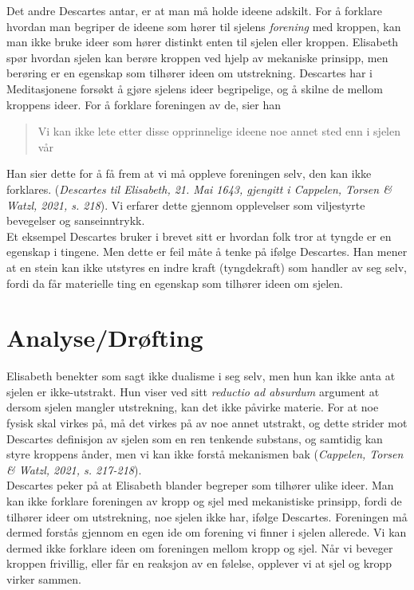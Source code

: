 \documentclass[12pt, a4paper]{article}
\begin{document}
Det andre Descartes antar, er at man må holde ideene adskilt. For å forklare hvordan man begriper de ideene som hører til sjelens \textit{forening} med kroppen, kan man ikke bruke ideer som hører distinkt enten til sjelen eller kroppen. Elisabeth spør hvordan sjelen kan berøre kroppen ved hjelp av mekaniske prinsipp, men berøring er en egenskap som tilhører ideen om utstrekning. Descartes har i Meditasjonene forsøkt å gjøre sjelens ideer begripelige, og å skilne de mellom kroppens ideer. For å forklare foreningen av de, sier han \begin{quote}
    Vi kan ikke lete etter disse opprinnelige ideene noe annet sted enn i sjelen vår
\end{quote} Han sier dette for å få frem at vi må oppleve foreningen selv, den kan ikke forklares. (\textit{Descartes til Elisabeth, 21. Mai 1643, gjengitt i Cappelen, Torsen \& Watzl, 2021, s. 218}). Vi erfarer dette gjennom opplevelser som viljestyrte bevegelser og sanseinntrykk. \\

Et eksempel Descartes bruker i brevet sitt er hvordan folk tror at tyngde er en egenskap i tingene. Men dette er feil måte å tenke på ifølge Descartes. Han mener at en stein kan ikke utstyres en indre kraft (tyngdekraft) som handler av seg selv, fordi da får materielle ting en egenskap som tilhører ideen om sjelen. 

\section{Analyse/Drøfting}

Elisabeth benekter som sagt ikke dualisme i seg selv, men hun kan ikke anta at sjelen er ikke-utstrakt. Hun viser ved sitt \textit{reductio ad absurdum} argument at dersom sjelen mangler utstrekning, kan det ikke påvirke materie. For at noe fysisk skal virkes på, må det virkes på av noe annet utstrakt, og dette strider mot Descartes definisjon av sjelen som en ren tenkende substans, og samtidig kan styre kroppens ånder, men vi kan ikke forstå mekanismen bak (\textit{Cappelen, Torsen \& Watzl, 2021, s. 217-218}). \\


Descartes peker på at Elisabeth blander begreper som tilhører ulike ideer. Man kan ikke forklare foreningen av kropp og sjel med mekanistiske prinsipp, fordi de tilhører ideer om utstrekning, noe sjelen ikke har, ifølge Descartes. Foreningen må dermed forstås gjennom en egen ide om forening vi finner i sjelen allerede. Vi kan dermed ikke forklare ideen om foreningen mellom kropp og sjel. Når vi beveger kroppen frivillig, eller får en reaksjon av en følelse, opplever vi at sjel og kropp virker sammen. \\
\end{document}
